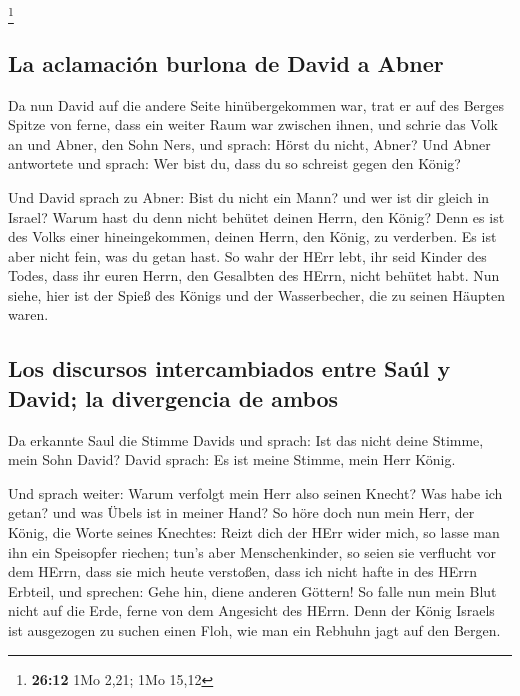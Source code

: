 \footnote{\textbf{26:12} 1Mo 2,21; 1Mo 15,12}

\hypertarget{la-aclamaciuxf3n-burlona-de-david-a-abner}{%
\subsection{La aclamación burlona de David a
Abner}\label{la-aclamaciuxf3n-burlona-de-david-a-abner}}

 Da nun David auf die andere Seite hinübergekommen war,
trat er auf des Berges Spitze von ferne, dass ein weiter Raum war
zwischen ihnen,  und schrie das Volk an und Abner, den
Sohn Ners, und sprach: Hörst du nicht, Abner? Und Abner antwortete und
sprach: Wer bist du, dass du so schreist gegen den König?

 Und David sprach zu Abner: Bist du nicht ein Mann? und
wer ist dir gleich in Israel? Warum hast du denn nicht behütet deinen
Herrn, den König? Denn es ist des Volks einer hineingekommen, deinen
Herrn, den König, zu verderben.  Es ist aber nicht fein,
was du getan hast. So wahr der HErr lebt, ihr seid Kinder des Todes,
dass ihr euren Herrn, den Gesalbten des HErrn, nicht behütet habt. Nun
siehe, hier ist der Spieß des Königs und der Wasserbecher, die zu seinen
Häupten waren.

\hypertarget{los-discursos-intercambiados-entre-sauxfal-y-david-la-divergencia-de-ambos}{%
\subsection{Los discursos intercambiados entre Saúl y David; la
divergencia de
ambos}\label{los-discursos-intercambiados-entre-sauxfal-y-david-la-divergencia-de-ambos}}

 Da erkannte Saul die Stimme Davids und sprach: Ist das
nicht deine Stimme, mein Sohn David? David sprach: Es ist meine Stimme,
mein Herr König.

 Und sprach weiter: Warum verfolgt mein Herr also seinen
Knecht? Was habe ich getan? und was Übels ist in meiner Hand?
 So höre doch nun mein Herr, der König, die Worte seines
Knechtes: Reizt dich der HErr wider mich, so lasse man ihn ein
Speisopfer riechen; tun's aber Menschenkinder, so seien sie verflucht
vor dem HErrn, dass sie mich heute verstoßen, dass ich nicht hafte in
des HErrn Erbteil, und sprechen: Gehe hin, diene anderen Göttern!
 So falle nun mein Blut nicht auf die Erde, ferne von dem
Angesicht des HErrn. Denn der König Israels ist ausgezogen zu suchen
einen Floh, wie man ein Rebhuhn jagt auf den Bergen.

